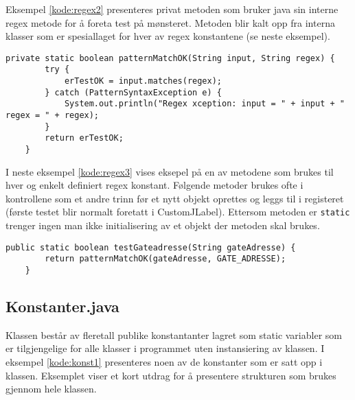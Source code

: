Eksempel \ref{kode:regex2} presenteres privat metoden som bruker java
sin interne regex metode for å foreta test på mønsteret. Metoden blir kalt opp fra interna klasser som er spesiallaget for hver av regex konstantene (se neste eksempel).

\begin{lstlisting}[caption=Private regex test metode., label=kode:regex2]
	private static boolean patternMatchOK(String input, String regex) {
        try {
            erTestOK = input.matches(regex);
        } catch (PatternSyntaxException e) {
            System.out.println("Regex xception: input = " + input + " regex = " + regex);
        }
        return erTestOK;
  	}
\end{lstlisting}


I neste eksempel \ref{kode:regex3} vises eksepel på en av metodene som brukes til hver og enkelt definiert regex konstant. Følgende metoder brukes ofte i kontrollene som et andre trinn før et nytt objekt oprettes og leggs til i registeret (første testet blir normalt foretatt i CustomJLabel). Ettersom metoden er \texttt{static} trenger ingen man ikke initialisering av et objekt der metoden skal brukes. 


\begin{lstlisting}[caption=Static regex metode til tilhørende regex møsnter streng., label=kode:regex3]
    public static boolean testGateadresse(String gateAdresse) {
        return patternMatchOK(gateAdresse, GATE_ADRESSE);
    }
\end{lstlisting}


\subsection{Konstanter.java} \label{subsec:konstanter}
Klassen består av fleretall publike konstantanter lagret som static variabler som er tilgjengelige for alle klasser i programmet uten instansiering av klassen. I eksempel \ref{kode:konst1} presenteres noen av de konstanter som er satt opp i klassen. Eksemplet viser et kort utdrag for å presentere strukturen som brukes gjennom hele klassen.

